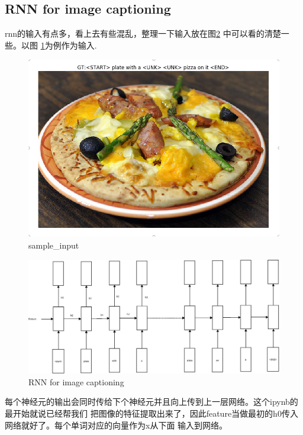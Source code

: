 \documentclass{ctexart}
\begin{document}
\subsection{RNN for image captioning}
rnn的输入有点多，看上去有些混乱，整理一下输入放在图\ref{fig:rnn for image captioning}
中可以看的清楚一些。以图
\ref{fig:rnn_sample_input}为例作为输入.\\
\begin{figure}
  \includegraphics[width=5in]{./assignment1_pic/rnn_caption_sample.png}
  \caption{sample\_input}
  \label{fig:rnn_sample_input}
\end{figure}

\begin{figure}
  \includegraphics[width=5in]{./assignment1_pic/rnn_caption_train.jpg}
  \caption{RNN for image captioning}
  \label{fig:rnn for image captioning}
\end{figure}

每个神经元的输出会同时传给下个神经元并且向上传到上一层网络。这个ipynb的最开始就说已经帮我们
把图像的特征提取出来了，因此feature当做最初的h0传入网络就好了。每个单词对应的向量作为x从下面
输入到网络。
\end{document}
